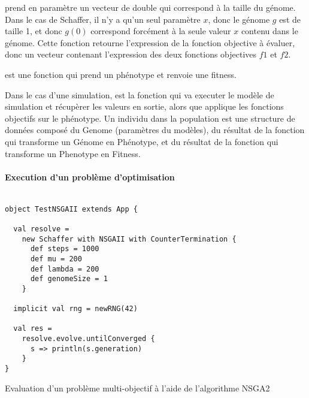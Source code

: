\begin{itemize}[label=\textbullet]
 prend en paramètre un vecteur de double qui correspond à la taille du génome. Dans le cas de Schaffer, il n'y a qu'un seul paramètre $x$, donc le génome $g$ est de taille 1, et donc $g(0)$ correspond forcément à la seule valeur $x$ contenu dans le génome. Cette fonction retourne l'expression de la fonction objective à évaluer, donc un vecteur contenant l'expression des deux fonctions objectives $f1$ et $f2$.

 est une fonction qui prend un phénotype et renvoie une fitness.

\end{itemize}


Dans le cas d'une simulation,  est la fonction qui va executer le modèle de simulation et récupèrer les valeurs en sortie, alors que  applique les fonctions objectifs sur le phénotype. Un individu dans la population est une structure de données composé du Genome (paramètres du modèles), du résultat de la fonction  qui transforme un Génome en Phénotype, et du résultat de la fonction  qui transforme un Phenotype en Fitness.

\paragraph{Execution d'un problème d'optimisation}

\begin{listing}[H]

\begin{verbatim}

object TestNSGAII extends App {

  val resolve =
    new Schaffer with NSGAII with CounterTermination {
      def steps = 1000
      def mu = 200
      def lambda = 200
      def genomeSize = 1
    }

  implicit val rng = newRNG(42)

  val res =
    resolve.evolve.untilConverged {
      s => println(s.generation)
    }
}

\end{verbatim}
\caption{Evaluation d'un problème multi-objectif à l'aide de l'algorithme NSGA2}
\label{alg:Evaluation_Schaffer}
\end{listing}

